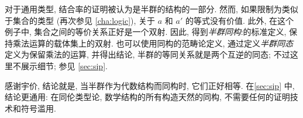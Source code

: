 对于通用类型, 结合率的证明被认为是半群的结构的一部分.
然而, 如果限制为类似于集合的类型 (再次参见 \cref{cha:logic}), 关于 $a$ 和 $a'$ 的等式没有价值.
此外, 在这个例子中, 集合之间的等价关系正好是一个双射.
因此, 得到\emph{半群同构}:的标准定义, 保持乘法运算的载体集上的双射.
也可以使用同构的范畴论定义, 通过定义\emph{半群同态}定义为保留乘法的运算, 并得出结论, 半群的等同关系就是两个互逆的同态;
不过这里不展示细节;
参见 \cref{sec:sip}.

感谢宇价, 结论就是, 当半群作为代数结构而同构时, 它们正好相等.
在\cref{sec:sip} 中, 结论更通用: 在同伦类型论, 数学结构的所有构造天然的同构, 不需要任何的证明技术和符号滥用.